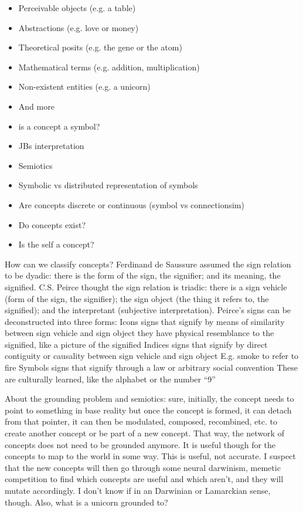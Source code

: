 \begin{itemize}
    \item Perceivable objects (e.g. a table)
    \item Abstractions (e.g. love or money)
    \item Theoretical posits (e.g. the gene or the atom)
    \item Mathematical terms (e.g. addition, multiplication)
    \item Non-existent entities (e.g. a unicorn)
    \item And more
\end{itemize}

\begin{itemize}
    \item is a concept a symbol? 
    \item JBs interpretation
    \item Semiotics
    \item Symbolic vs distributed representation of symbols
    \item Are concepts discrete or continuous (symbol vs connectionsim)
    \item Do concepts exist?
    \item Is the self a concept?
\end{itemize}

How can we classify concepts?
Ferdinand de Saussure assumed the sign relation to be dyadic: 
there is the form of the sign, the signifier; 
and its meaning, the signified. 
C.S. Peirce thought the sign relation is triadic: 
there is a sign vehicle (form of the sign, the signifier); 
the sign object (the thing it refers to, the signified);
and the interpretant (subjective interpretation). 
Peirce’s signs can be deconstructed into three forms:
Icons
	signs that signify by means of similarity between sign vehicle and sign object
	they have physical resemblance to the signified, like a picture of the signified
Indices
	signs that signify by direct contiguity or causality between sign vehicle and sign object
	E.g. smoke to refer to fire
Symbols 
	signs that signify through a law or arbitrary social convention
	These are culturally learned, like the alphabet or the number “9”




About the grounding problem and semiotics: sure, initially, the concept needs to point to something in base reality but once the concept is formed, it can detach from that pointer, it can then be modulated, composed, recombined, etc. to create another concept or be part of a new concept. That way, the network of concepts does not need to be grounded anymore. It is useful though for the concepts to map to the world in some way. This is useful, not accurate. I suspect that the new concepts will then go through some neural darwinism, memetic competition to find which concepts are useful and which aren’t, and they will mutate accordingly. I don’t know if in an Darwinian or Lamarckian sense, though. Also, what is a unicorn grounded to?


